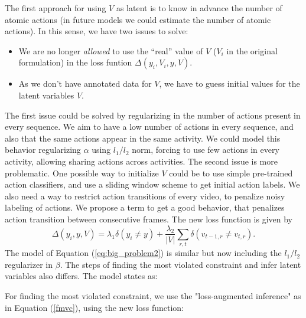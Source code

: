 \documentclass[10pt,letterpaper]{article}
\newcommand{\+}[1]{\ensuremath{{\boldsymbol #1}}}
\begin{document}
The first approach for using $V$ as latent is to know in advance the number of atomic actions (in future models we could estimate the number of atomic actions). In this sense, we have two issues to solve:
\begin{itemize}
\item We are no longer \emph{allowed} to use the ``real'' value of $V$ ($V_i$ in the original formulation) in the loss funtion $\Delta(y_i,V_i,y,V)$.
\item As we don't have annotated data for $V$, we have to guess initial values for the latent variables $V$.
\end{itemize}
The first issue could be solved by regularizing in the number of actions present in every sequence. We aim to have a low number of actions in every sequence, and also that the same actions appear in the same activity. We could model this behavior regularizing $\alpha$ using $l_1/l_2$ norm, forcing to use few actions in every activity, allowing sharing actions across activities. The second issue is more problematic. One possible way to initialize $V$ could be to use simple pre-trained action classifiers, and use a sliding window scheme to get initial action labels. 
%
We also need a way to restrict action transitions of every video, to penalize noisy labeling of actions. We propose a term to get a good behavior, that penalizes action transition between consecutive frames. The new loss function is given by
 \begin{equation}
\label{loss_func_vlatent}
\Delta(y_i, y, V) =
  \lambda_1 \delta(y_i \neq y)
+  \frac{\lambda_2}{|V|}  \sum_{r,t} \delta(v_{t-1,r} \neq v_{t,r} ).
\end{equation}
The model of Equation (\ref{eq:big_problem2}) is similar but now including the $l_1/l_2$ regularizer in $\beta$. The steps of finding the most violated constraint and infer latent variables also differs. The model states as:



For finding the most violated constraint, we use the "loss-augmented inference" as in Equation (\ref{fmvc}), using the new loss function:
\end{document}

